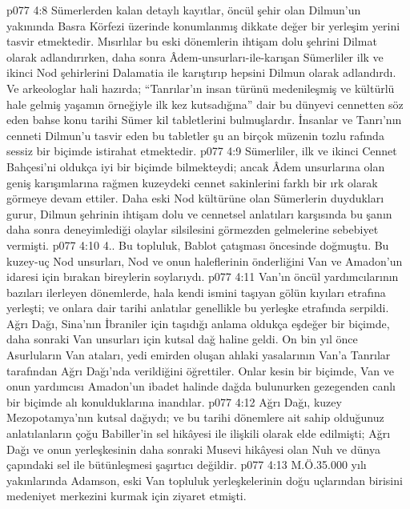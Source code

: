 \vs p077 4:8 Sümerlerden kalan detaylı kayıtlar, öncül şehir olan Dilmun’un yakınında Basra Körfezi üzerinde konumlanmış dikkate değer bir yerleşim yerini tasvir etmektedir. Mısırlılar bu eski dönemlerin ihtişam dolu şehrini Dilmat olarak adlandırırken, daha sonra Âdem\hyp{}unsurları\hyp{}ile\hyp{}karışan Sümerliler ilk ve ikinci Nod şehirlerini Dalamatia ile karıştırıp hepsini Dilmun olarak adlandırdı. Ve arkeologlar hali hazırda; “Tanrılar’ın insan türünü medenileşmiş ve kültürlü hale gelmiş yaşamın örneğiyle ilk kez kutsadığına” dair bu dünyevi cennetten söz eden bahse konu tarihi Sümer kil tabletlerini bulmuşlardır. İnsanlar ve Tanrı’nın cenneti Dilmun’u tasvir eden bu tabletler şu an birçok müzenin tozlu rafında sessiz bir biçimde istirahat etmektedir.
\vs p077 4:9 Sümerliler, ilk ve ikinci Cennet Bahçesi’ni oldukça iyi bir biçimde bilmekteydi; ancak Âdem unsurlarına olan geniş karışımlarına rağmen kuzeydeki cennet sakinlerini farklı bir ırk olarak görmeye devam ettiler. Daha eski Nod kültürüne olan Sümerlerin duydukları gurur, Dilmun şehrinin ihtişam dolu ve cennetsel anlatıları karşısında bu şanın daha sonra deneyimlediği olaylar silsilesini görmezden gelmelerine sebebiyet vermişti.
\vs p077 4:10 4.\bibnobreakspace {}. Bu topluluk, Bablot çatışması öncesinde doğmuştu. Bu kuzey\hyp{}uç Nod unsurları, Nod ve onun haleflerinin önderliğini Van ve Amadon’un idaresi için bırakan bireylerin soylarıydı.
\vs p077 4:11 Van’ın öncül yardımcılarının bazıları ilerleyen dönemlerde, hala kendi ismini taşıyan gölün kıyıları etrafına yerleşti; ve onlara dair tarihi anlatılar genellikle bu yerleşke etrafında serpildi. Ağrı Dağı, Sina’nın İbraniler için taşıdığı anlama oldukça eşdeğer bir biçimde, daha sonraki Van unsurları için kutsal dağ haline geldi. On bin yıl önce Asurluların Van ataları, yedi emirden oluşan ahlaki yasalarının Van’a Tanrılar tarafından Ağrı Dağı’nda verildiğini öğrettiler. Onlar kesin bir biçimde, Van ve onun yardımcısı Amadon’un ibadet halinde dağda bulunurken gezegenden canlı bir biçimde alı konulduklarına inandılar.
\vs p077 4:12 Ağrı Dağı, kuzey Mezopotamya’nın kutsal dağıydı; ve bu tarihi dönemlere ait sahip olduğunuz anlatılanların çoğu Babiller’in sel hikâyesi ile ilişkili olarak elde edilmişti; Ağrı Dağı ve onun yerleşkesinin daha sonraki Musevi hikâyesi olan Nuh ve dünya çapındaki sel ile bütünleşmesi şaşırtıcı değildir.
\vs p077 4:13 M.Ö.35.000 yılı yakınlarında Adamson, eski Van topluluk yerleşkelerinin doğu uçlarından birisini medeniyet merkezini kurmak için ziyaret etmişti.
